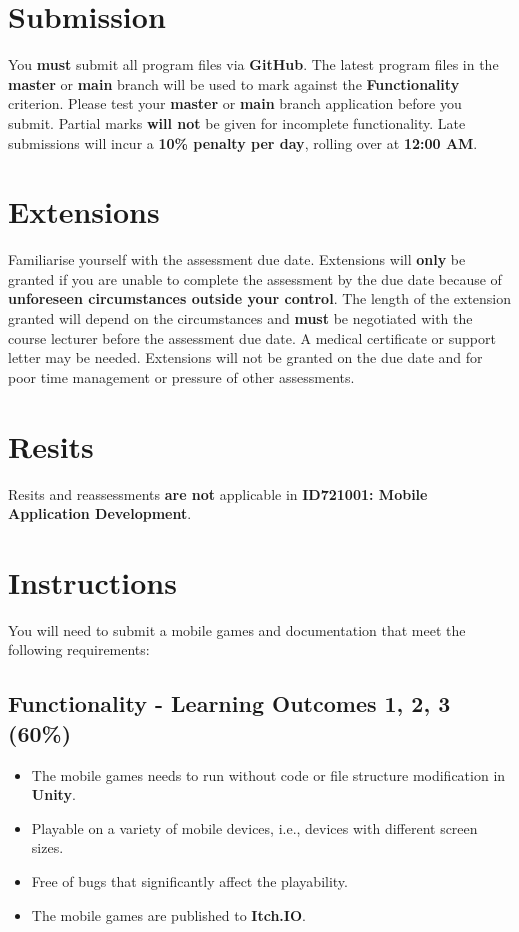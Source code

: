 \documentclass{article}
\begin{document}
\section*{Submission}
You \textbf{must} submit all program files via \textbf{GitHub}. The latest program files in the \textbf{master} or \textbf{main} branch will be used to mark against the \textbf{Functionality} criterion. Please test your \textbf{master} or \textbf{main} branch application before you submit. Partial marks \textbf{will not} be given for incomplete functionality. Late submissions will incur a \textbf{10\% penalty per day}, rolling over at \textbf{12:00 AM}.

\section*{Extensions}
Familiarise yourself with the assessment due date. Extensions will \textbf{only} be granted if you are unable to complete the assessment by the due date because of \textbf{unforeseen circumstances outside your control}. The length of the extension granted will depend on the circumstances and \textbf{must} be negotiated with the course lecturer before the assessment due date. A medical certificate or support letter may be needed. Extensions will not be granted on the due date and for poor time management or pressure of other assessments.

\section*{Resits}
Resits and reassessments \textbf{are not} applicable in \textbf{ID721001: Mobile Application Development}.

\section*{Instructions}
You will need to submit a mobile games and documentation that meet the following requirements:

\subsection*{Functionality - Learning Outcomes 1, 2, 3 (60\%)}
\begin{itemize}
	\item The mobile games needs to run without code or file structure modification in \textbf{Unity}.
	\item Playable on a variety of mobile devices, i.e., devices with different screen sizes.
	\item Free of bugs that significantly affect the playability.
	\item The mobile games are published to \textbf{Itch.IO}.
\end{itemize}
\end{document}
